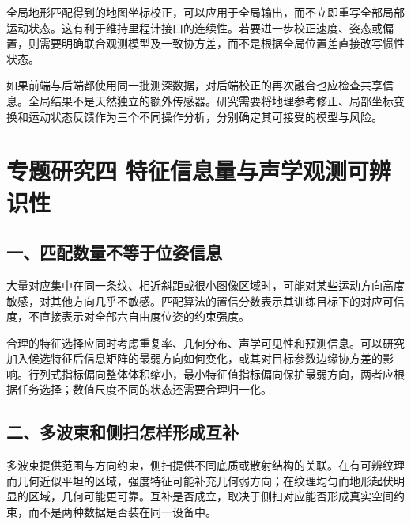全局地形匹配得到的地图坐标校正，可以应用于全局输出，而不立即重写全部局部运动状态。这有利于维持里程计接口的连续性。若要进一步校正速度、姿态或偏置，则需要明确联合观测模型及一致协方差，而不是根据全局位置差直接改写惯性状态。

如果前端与后端都使用同一批测深数据，对后端校正的再次融合也应检查共享信息。全局结果不是天然独立的额外传感器。研究需要将地理参考修正、局部坐标变换和运动状态反馈作为三个不同操作分析，分别确定其可接受的模型与风险。

\hypertarget{ux4e13ux9898ux7814ux7a76ux56db-ux7279ux5f81ux4fe1ux606fux91cfux4e0eux58f0ux5b66ux89c2ux6d4bux53efux8fa8ux8bc6ux6027}{%
\section{专题研究四 特征信息量与声学观测可辨识性}\label{ux4e13ux9898ux7814ux7a76ux56db-ux7279ux5f81ux4fe1ux606fux91cfux4e0eux58f0ux5b66ux89c2ux6d4bux53efux8fa8ux8bc6ux6027}}

\hypertarget{ux4e00ux5339ux914dux6570ux91cfux4e0dux7b49ux4e8eux4f4dux59ffux4fe1ux606f}{%
\subsection{一、匹配数量不等于位姿信息}\label{ux4e00ux5339ux914dux6570ux91cfux4e0dux7b49ux4e8eux4f4dux59ffux4fe1ux606f}}

大量对应集中在同一条纹、相近斜距或很小图像区域时，可能对某些运动方向高度敏感，对其他方向几乎不敏感。匹配算法的置信分数表示其训练目标下的对应可信度，不直接表示对全部六自由度位姿的约束强度。

合理的特征选择应同时考虑重复率、几何分布、声学可见性和预测信息。可以研究加入候选特征后信息矩阵的最弱方向如何变化，或其对目标参数边缘协方差的影响。行列式指标偏向整体体积缩小，最小特征值指标偏向保护最弱方向，两者应根据任务选择；数值尺度不同的状态还需要合理归一化。

\hypertarget{ux4e8cux591aux6ce2ux675fux548cux4fa7ux626bux600eux6837ux5f62ux6210ux4e92ux8865}{%
\subsection{二、多波束和侧扫怎样形成互补}\label{ux4e8cux591aux6ce2ux675fux548cux4fa7ux626bux600eux6837ux5f62ux6210ux4e92ux8865}}

多波束提供范围与方向约束，侧扫提供不同底质或散射结构的关联。在有可辨纹理而几何近似平坦的区域，强度特征可能补充几何弱方向；在纹理均匀而地形起伏明显的区域，几何可能更可靠。互补是否成立，取决于侧扫对应能否形成真实空间约束，而不是两种数据是否装在同一设备中。

